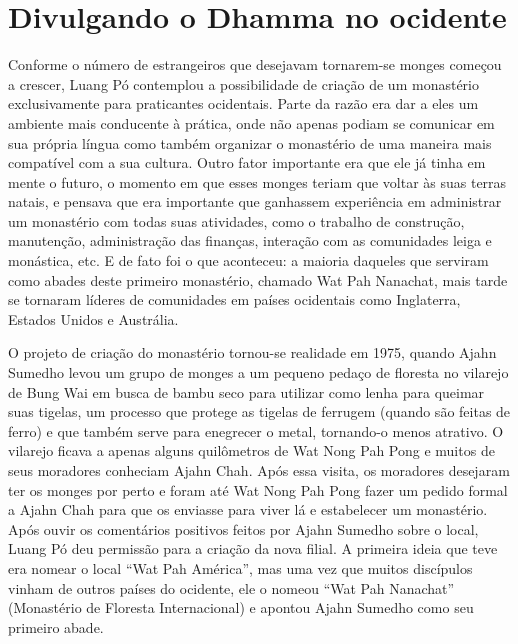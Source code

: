 \chapter{Divulgando o Dhamma no ocidente}

Conforme o número de estrangeiros que desejavam tornarem-se monges
começou a crescer, Luang Pó contemplou a possibilidade de criação de um
monastério exclusivamente para praticantes ocidentais. Parte da razão
era dar a eles um ambiente mais conducente à prática, onde não apenas
podiam se comunicar em sua própria língua como também organizar o
monastério de uma maneira mais compatível com a sua cultura. Outro fator
importante era que ele já tinha em mente o futuro, o momento em que
esses monges teriam que voltar às suas terras natais, e pensava que era
importante que ganhassem experiência em administrar um monastério com
todas suas atividades, como o trabalho de construção, manutenção,
administração das finanças, interação com as comunidades leiga e
monástica, etc. E de fato foi o que aconteceu: a maioria daqueles que
serviram como abades deste primeiro monastério, chamado Wat Pah
Nanachat, mais tarde se tornaram líderes de comunidades em países
ocidentais como Inglaterra, Estados Unidos e Austrália.

O projeto de criação do monastério tornou-se realidade em 1975, quando
Ajahn Sumedho levou um grupo de monges a um pequeno pedaço de floresta
no vilarejo de Bung Wai em busca de bambu seco para utilizar como lenha
para queimar suas tigelas, um processo que protege as tigelas de
ferrugem (quando são feitas de ferro) e que também serve para enegrecer
o metal, tornando-o menos atrativo. O vilarejo ficava a apenas alguns
quilômetros de Wat Nong Pah Pong e muitos de seus moradores conheciam
Ajahn Chah. Após essa visita, os moradores desejaram ter os monges por
perto e foram até Wat Nong Pah Pong fazer um pedido formal a Ajahn Chah
para que os enviasse para viver lá e estabelecer um monastério. Após
ouvir os comentários positivos feitos por Ajahn Sumedho sobre o local,
Luang Pó deu permissão para a criação da nova filial. A primeira ideia
que teve era nomear o local ``Wat Pah América'', mas uma vez que muitos
discípulos vinham de outros países do ocidente, ele o nomeou ``Wat Pah
Nanachat'' (Monastério de Floresta Internacional) e apontou Ajahn
Sumedho como seu primeiro abade.

